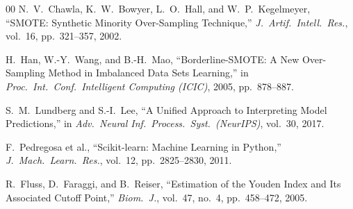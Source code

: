 \documentclass[conference]{IEEEtran}
\begin{document}
\begin{thebibliography}{00}
N.~V.~Chawla, K.~W.~Bowyer, L.~O.~Hall, and W.~P.~Kegelmeyer, ``SMOTE: Synthetic Minority Over-Sampling Technique,'' \textit{J.\ Artif.\ Intell.\ Res.}, vol.~16, pp.~321--357, 2002.

H.~Han, W.-Y.~Wang, and B.-H.~Mao, ``Borderline-SMOTE: A New Over-Sampling Method in Imbalanced Data Sets Learning,'' in \textit{Proc.\ Int.\ Conf.\ Intelligent Computing (ICIC)}, 2005, pp.~878--887.

S.~M.~Lundberg and S.-I.~Lee, ``A Unified Approach to Interpreting Model Predictions,'' in \textit{Adv.\ Neural Inf.\ Process.\ Syst.\ (NeurIPS)}, vol.~30, 2017.

F.~Pedregosa et al., ``Scikit-learn: Machine Learning in Python,'' \textit{J.\ Mach.\ Learn.\ Res.}, vol.~12, pp.~2825--2830, 2011.

R.~Fluss, D.~Faraggi, and B.~Reiser, ``Estimation of the Youden Index and Its Associated Cutoff Point,'' \textit{Biom.\ J.}, vol.~47, no.~4, pp.~458--472, 2005.

\end{thebibliography}
\end{document}
